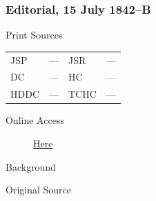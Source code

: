 		\subsubsection{Editorial, 15 July 1842--B}
			\label{EMS-1842-JS-15-JUL-1842-B}
			
			\begin{description}
				\item[Print Sources]
			\end{description}

			\begin{tabular}{p{0.5in}p{1in}p{0.5in}p{1in}}
				JSP	 	& ---		& JSR 		& --- \\
				DC	 	& ---		& HC 		& --- \\
				HDDC 	& ---		& TCHC 		& --- \\
			\end{tabular}
			
			\begin{description}
				\item[Online Access] \href{https://www.josephsmithpapers.org/paper-summary/editorial-15-july-1842-b/1}{Here}
			\end{description}
			
			\begin{description}
				\item[Background]
			\end{description}
			
			
			\begin{description}
				\item[Original Source]
			\end{description}
			
			
